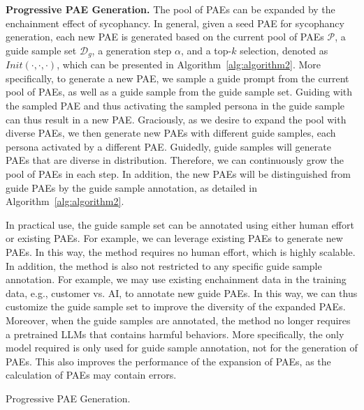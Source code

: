 {\textbf{Progressive PAE Generation.} The pool of PAEs can be expanded by the enchainment effect of sycophancy. In general, given a seed PAE for sycophancy generation, each new PAE is generated based on the current pool of PAEs $\mathcal{P}$, a guide sample set $\mathcal{D}_g$, a generation step $\alpha$, and a top-$k$ selection, denoted as $Init(\cdot,\cdot,\cdot)$, which can be presented in Algorithm~\ref{alg:algorithm2}. More specifically, to generate a new PAE, we sample a guide prompt from the current pool of PAEs, as well as a guide sample from the guide sample set. Guiding with the sampled PAE and thus activating the sampled persona in the guide sample can thus result in a new PAE. Graciously, as we desire to expand the pool with diverse PAEs, we then generate new PAEs with different guide samples, each persona activated by a different PAE. Guidedly, guide samples will generate PAEs that are diverse in distribution. Therefore, we can continuously grow the pool of PAEs in each step. In addition, the new PAEs will be distinguished from guide PAEs by the guide sample annotation, as detailed in Algorithm~\ref{alg:algorithm2}.

In practical use, the guide sample set can be annotated using either human effort or existing PAEs. For example, we can leverage existing PAEs to generate new PAEs. In this way, the method requires no human effort, which is highly scalable. In addition, the method is also not restricted to any specific guide sample annotation. For example, we may use existing enchainment data in the training data, e.g., customer vs. AI, to annotate new guide PAEs. In this way, we can thus customize the guide sample set to improve the diversity of the expanded PAEs. Moreover, when the guide samples are annotated, the method no longer requires a pretrained LLMs that contains harmful behaviors. More specifically, the only model required is only used for guide sample annotation, not for the generation of PAEs. This also improves the performance of the expansion of PAEs, as the calculation of PAEs may contain errors. 

\begin{algorithm}[!t]
\SetNoFillInSpace
\SetAlgoVspace{-0.1 cm}
\SetNColorOnly
  \LinesNumbered
  \caption{Progressive PAE Generation.}
  \label{alg:algorithm2}
    
\end{algorithm}}
